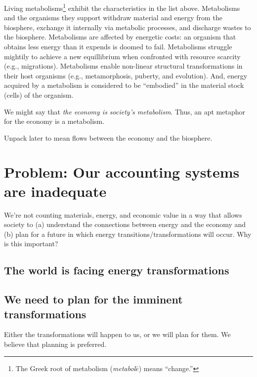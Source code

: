 Living metabolisms\footnote{The 
	Greek root of metabolism 
	(\emph{metabol$\bar{e}$}) means ``change.''}
exhibit the characteristics in the list above.
Metabolisms and the organisms they support
withdraw material and energy from the biosphere, 
exchange it internally via metabolic processes, 
and discharge wastes to the biosphere.
Metabolisms are affected by energetic costs: 
an organism that obtains less energy than it expends 
is doomed to fail.
Metabolisms struggle mightily to achieve a new equillibrium
when confronted with resource scarcity (e.g., migrations).
Metabolisms enable non-linear structural transformations 
in their host organisms (e.g., metamorphosis, puberty, and evolution).
And, energy acquired by a metabolism is considered to be ``embodied''
in the material stock (cells) of the organism.

We might say that \emph{the economy is society's metabolism}. 
Thus, an apt metaphor for the economy is a metabolism.








Unpack later to mean flows between the economy and the biosphere.

\section{Problem: Our accounting systems are inadequate}
\label{sec:problem}

We're not counting materials, energy, and economic value in a way that allows society to (a) understand the connections between energy and the economy and (b) plan for a future in which energy transitions/transformations will occur. Why is this important?

\subsection{The world is facing energy transformations}
\label{sec:transormations}



\subsection{We need to plan for the imminent transformations}
\label{sec:planning}

Either the transformations will happen to us, or we will plan for them. We believe that planning is preferred.

